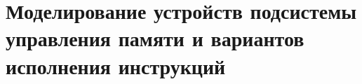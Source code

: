 %
%
%

\section{Моделирование устройств подсистемы управления памяти и вариантов исполнения инструкций}\label{sec:state_model_section}

